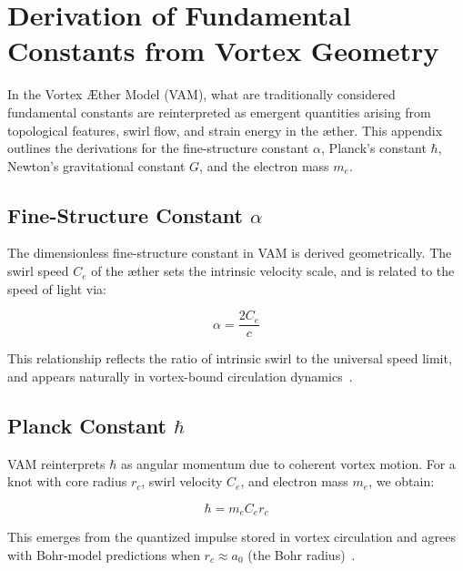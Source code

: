 \documentclass[preprint]{revtex4-2}
\begin{document}
        \section{Derivation of Fundamental Constants from Vortex Geometry}\label{sec:constants_derivation}
            In the Vortex \AE{}ther Model (VAM), what are traditionally considered fundamental constants are reinterpreted as emergent quantities arising from topological features, swirl flow, and strain energy in the æther. This appendix outlines the derivations for the fine-structure constant \( \alpha \), Planck’s constant \( \hbar \), Newton’s gravitational constant \( G \), and the electron mass \( m_e \).
        
            \subsection{Fine-Structure Constant \boldmath\( \alpha \)}
            The dimensionless fine-structure constant in VAM is derived geometrically. The swirl speed \( C_e \) of the æther sets the intrinsic velocity scale, and is related to the speed of light via:
        
            \begin{equation}
            \alpha = \frac{2C_e}{c}
            \label{eq:fine_structure_vam}
            \end{equation}
        
            This relationship reflects the ratio of intrinsic swirl to the universal speed limit, and appears naturally in vortex-bound circulation dynamics~\cite{volovik2003universe, ranada1990topological}.
        
            \subsection{Planck Constant \boldmath\( \hbar \)}
            VAM reinterprets \( \hbar \) as angular momentum due to coherent vortex motion. For a knot with core radius \( r_c \), swirl velocity \( C_e \), and electron mass \( m_e \), we obtain:
        
            \begin{equation}
            \hbar = m_e C_e r_c
            \label{eq:planck_vam}
            \end{equation}
        
            This emerges from the quantized impulse stored in vortex circulation and agrees with Bohr-model predictions when \( r_c \approx a_0 \) (the Bohr radius)~\cite{moffatt1969knottedness}.
        
\end{document}
